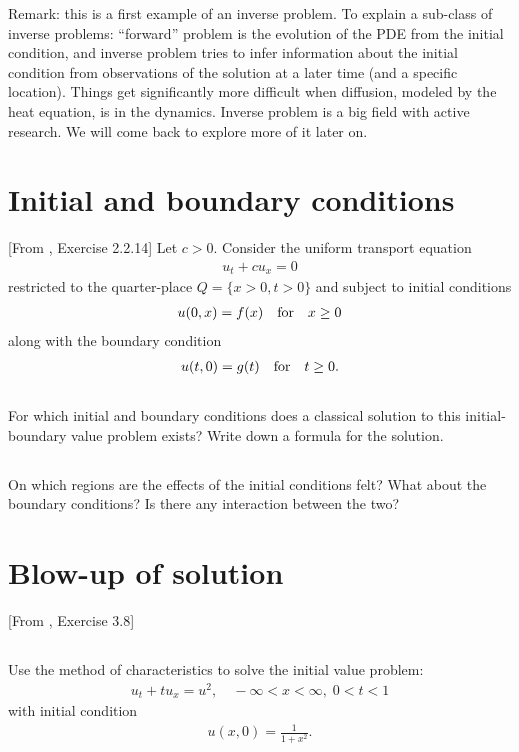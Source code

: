 \documentclass[11pt,letterpaper]{report}
\begin{document}
Remark: this is a first example of an inverse problem. To explain a sub-class of inverse problems: ``forward'' problem is the evolution of the PDE from the initial condition, and inverse problem tries to infer information about the initial condition from observations of the solution at a later time (and a specific location). Things get significantly more difficult when diffusion, modeled by the heat equation, is in the dynamics. Inverse problem is a big field with active research. We will come back to explore more of it later on.

\section{Initial and boundary conditions}
[From \cite{Olver_14}, Exercise 2.2.14] Let $c>0$. Consider the uniform transport equation
\begin{align}
    u_t+cu_x = 0
\end{align}
restricted to the quarter-place $Q = \{x>0, t>0\}$ and subject to initial conditions
\begin{align}
    u(0,x) = f(x) \quad \mbox{for} \quad x\geq 0
\end{align}
along with the boundary condition
\begin{align}
    u(t,0) = g(t) \quad \mbox{for} \quad t\geq 0.
\end{align}

\subsection{}
For which initial and boundary conditions does a classical solution to this initial-boundary value problem exists? Write down a formula for the solution.

\subsection{}
On which regions are the effects of the initial conditions felt? What about the boundary conditions? Is there any interaction between the two?

\section{Blow-up of solution}
[From \cite{ShearerLevy_15}, Exercise 3.8] 

\subsection{}
Use the method of characteristics to solve the initial value problem: 
\begin{align}
    u_t+tu_x = u^2,\quad -\infty<x<\infty,\; 0<t<1
\end{align}
with initial condition 
\begin{align}
    u(x,0) = \frac{1}{1+x^2}.
\end{align}
\end{document}
